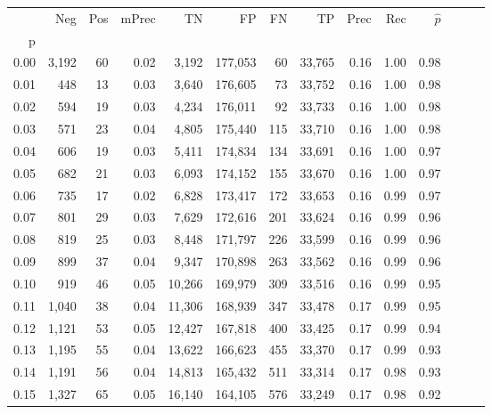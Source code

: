 \begin{tabular}{rrrrrrrrrrrrrr}
\toprule
{} &    Neg &  Pos & mPrec &       TN &       FP &      FN &      TP &  Prec &   Rec & $\hat{p}$ \\
p    &        &      &       &          &          &         &         &       &       &           \\
\midrule
0.00 &  3,192 &   60 &  0.02 &    3,192 &  177,053 &      60 &  33,765 &  0.16 &  1.00 &      0.98 \\
0.01 &    448 &   13 &  0.03 &    3,640 &  176,605 &      73 &  33,752 &  0.16 &  1.00 &      0.98 \\
0.02 &    594 &   19 &  0.03 &    4,234 &  176,011 &      92 &  33,733 &  0.16 &  1.00 &      0.98 \\
0.03 &    571 &   23 &  0.04 &    4,805 &  175,440 &     115 &  33,710 &  0.16 &  1.00 &      0.98 \\
0.04 &    606 &   19 &  0.03 &    5,411 &  174,834 &     134 &  33,691 &  0.16 &  1.00 &      0.97 \\
0.05 &    682 &   21 &  0.03 &    6,093 &  174,152 &     155 &  33,670 &  0.16 &  1.00 &      0.97 \\
0.06 &    735 &   17 &  0.02 &    6,828 &  173,417 &     172 &  33,653 &  0.16 &  0.99 &      0.97 \\
0.07 &    801 &   29 &  0.03 &    7,629 &  172,616 &     201 &  33,624 &  0.16 &  0.99 &      0.96 \\
0.08 &    819 &   25 &  0.03 &    8,448 &  171,797 &     226 &  33,599 &  0.16 &  0.99 &      0.96 \\
0.09 &    899 &   37 &  0.04 &    9,347 &  170,898 &     263 &  33,562 &  0.16 &  0.99 &      0.96 \\
0.10 &    919 &   46 &  0.05 &   10,266 &  169,979 &     309 &  33,516 &  0.16 &  0.99 &      0.95 \\
0.11 &  1,040 &   38 &  0.04 &   11,306 &  168,939 &     347 &  33,478 &  0.17 &  0.99 &      0.95 \\
0.12 &  1,121 &   53 &  0.05 &   12,427 &  167,818 &     400 &  33,425 &  0.17 &  0.99 &      0.94 \\
0.13 &  1,195 &   55 &  0.04 &   13,622 &  166,623 &     455 &  33,370 &  0.17 &  0.99 &      0.93 \\
0.14 &  1,191 &   56 &  0.04 &   14,813 &  165,432 &     511 &  33,314 &  0.17 &  0.98 &      0.93 \\
0.15 &  1,327 &   65 &  0.05 &   16,140 &  164,105 &     576 &  33,249 &  0.17 &  0.98 &      0.92 \\

\end{tabular}
